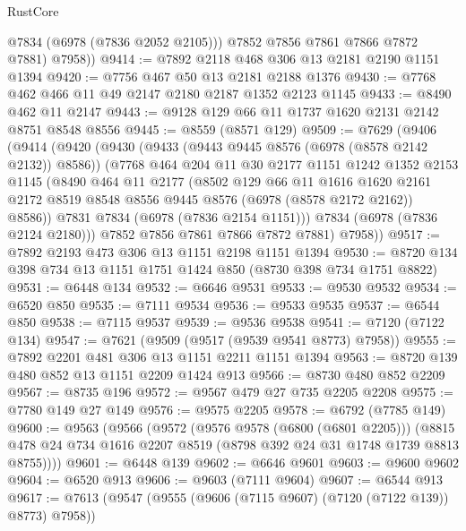 \begin{lexlean}{RustCore}
\begin{coremodule}
            @7834
            (@6978 (@7836 @2052 @2105)))
          @7852
          @7856
          @7861
          @7866
          @7872
          @7881)
        @7958))
@9414 := @7892 @2118 @468 @306 @13 @2181 @2190 @1151 @1394
@9420 := @7756 @467 @50 @13 @2181 @2188 @1376
@9430 := @7768 @462 @466 @11 @49 @2147 @2180 @2187 @1352 @2123 @1145
@9433 := @8490 @462 @11 @2147
@9443 := @9128 @129 @66 @11 @1737 @1620 @2131 @2142 @8751 @8548 @8556
@9445 := @8559 (@8571 @129)
@9509 := @7629
    (@9406
      (@9414
        (@9420
          (@9430
            (@9433 (@9443 @9445 @8576 (@6978 (@8578 @2142 @2132)) @8586))
            (@7768
              @464
              @204
              @11
              @30
              @2177
              @1151
              @1242
              @1352
              @2153
              @1145
              (@8490
                @464
                @11
                @2177
                (@8502
                  @129
                  @66
                  @11
                  @1616
                  @1620
                  @2161
                  @2172
                  @8519
                  @8548
                  @8556
                  @9445
                  @8576
                  (@6978 (@8578 @2172 @2162))
                  @8586))
              @7831
              @7834
              (@6978 (@7836 @2154 @1151)))
            @7834
            (@6978 (@7836 @2124 @2180)))
          @7852
          @7856
          @7861
          @7866
          @7872
          @7881)
        @7958))
@9517 := @7892 @2193 @473 @306 @13 @1151 @2198 @1151 @1394
@9530 := @8720 @134 @398 @734 @13 @1151 @1751 @1424 @850 (@8730 @398 @734 @1751 @8822)
@9531 := @6448 @134
@9532 := @6646 @9531
@9533 := @9530 @9532
@9534 := @6520 @850
@9535 := @7111 @9534
@9536 := @9533 @9535
@9537 := @6544 @850
@9538 := @7115 @9537
@9539 := @9536 @9538
@9541 := @7120 (@7122 @134)
@9547 := @7621 (@9509 (@9517 (@9539 @9541 @8773) @7958))
@9555 := @7892 @2201 @481 @306 @13 @1151 @2211 @1151 @1394
@9563 := @8720 @139 @480 @852 @13 @1151 @2209 @1424 @913
@9566 := @8730 @480 @852 @2209
@9567 := @8735 @196
@9572 := @9567 @479 @27 @735 @2205 @2208
@9575 := @7780 @149 @27 @149
@9576 := @9575 @2205
@9578 := @6792 (@7785 @149)
@9600 := @9563
    (@9566
      (@9572
        (@9576 @9578 (@6800 (@6801 @2205)))
        (@8815 @478 @24 @734 @1616 @2207 @8519 (@8798 @392 @24 @31 @1748 @1739 @8813 @8755))))
@9601 := @6448 @139
@9602 := @6646 @9601
@9603 := @9600 @9602
@9604 := @6520 @913
@9606 := @9603 (@7111 @9604)
@9607 := @6544 @913
@9617 := @7613 (@9547 (@9555 (@9606 (@7115 @9607) (@7120 (@7122 @139)) @8773) @7958))

\end{coremodule}
\end{lexlean}
